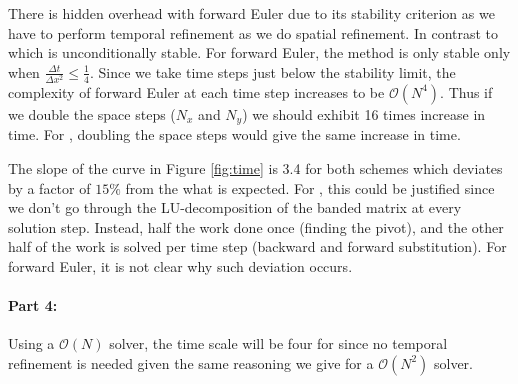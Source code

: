 There is hidden overhead with forward Euler due to its stability criterion as we have to perform temporal refinement as we do spatial refinement. In contrast to \protect{\cn} which is unconditionally stable. For forward Euler, the method is only stable only when $\frac{\Delta t}{\Delta x^{2}} \leq \frac{1}{4}$. Since we take time steps just below the stability limit, the complexity of forward Euler at each time step increases to be $\mathcal{O}(N^{4})$. Thus if we double the space steps ($N_{x}$ and $N_{y}$) we should exhibit 16 times increase in time. For \protect{\cn}, doubling the space steps would give the same increase in time. 

The slope of the curve in Figure \ref{fig:time} is 3.4 for both schemes which deviates by a factor of $15\%$ from the what is expected. For \protect{\cn}, this could be justified since we don't go through the LU-decomposition of the banded matrix at every solution step. Instead, half the work done once (finding the pivot), and the other half of the work is solved per time step (backward and forward substitution). For forward Euler, it is not clear why such deviation occurs. 


\paragraph{Part 4:} Using a $\mathcal{O}(N)$ solver, the time scale will be four for \protect{\cn} since no temporal refinement is needed given the same reasoning we give for a $\mathcal{O}(N^{2})$ solver.